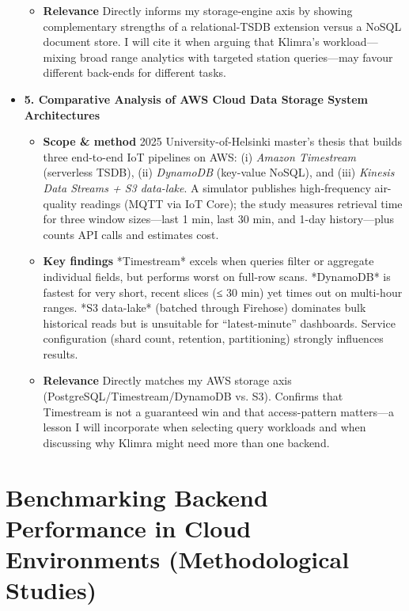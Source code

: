 \documentclass[11pt]{article}
\begin{document}
\begin{itemize}
\begin{itemize}
      \item[] \textbf{Relevance}  Directly informs my storage-engine axis by showing complementary strengths of a relational-TSDB extension versus a NoSQL document store.  I will cite it when arguing that Klimra’s workload—mixing broad range analytics with targeted station queries—may favour different back-ends for different tasks.
  \end{itemize}
    \item[] \textbf{5. Comparative Analysis of AWS Cloud Data Storage System Architectures} 
    \begin{itemize}
      \item[] \textbf{Scope \& method}  
      2025 University-of-Helsinki master’s thesis that builds three end-to-end IoT pipelines on AWS:  
      (i) \textit{Amazon Timestream} (serverless TSDB),  
      (ii) \textit{DynamoDB} (key-value NoSQL), and  
      (iii) \textit{Kinesis Data Streams + S3 data-lake}.  
      A simulator publishes high-frequency air-quality readings (MQTT via IoT Core); the study measures retrieval time for three window sizes—last 1 min, last 30 min, and 1-day history—plus counts API calls and estimates cost.
      
      \item[] \textbf{Key findings}  
      *Timestream* excels when queries filter or aggregate individual fields, but performs worst on full-row scans.  
      *DynamoDB* is fastest for very short, recent slices (≤ 30 min) yet times out on multi-hour ranges.  
      *S3 data-lake* (batched through Firehose) dominates bulk historical reads but is unsuitable for “latest-minute” dashboards.  Service configuration (shard count, retention, partitioning) strongly influences results.
      
      \item[] \textbf{Relevance}  
      Directly matches my AWS storage axis (PostgreSQL/Timestream/DynamoDB vs. S3).  Confirms that Timestream is not a guaranteed win and that access-pattern matters—a lesson I will incorporate when selecting query workloads and when discussing why Klimra might need more than one backend.
  \end{itemize}
\end{itemize}

\newpage
\section*{Benchmarking Backend Performance in Cloud Environments (Methodological Studies)}
\end{document}
